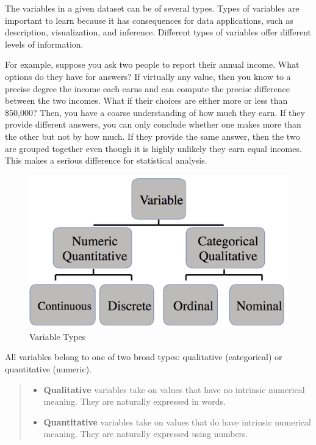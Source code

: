 \documentclass[
]{book}
\providecommand{\tightlist}{%
  \setlength{\itemsep}{0pt}\setlength{\parskip}{0pt}}
\begin{document}
The variables in a given dataset can be of several types. Types of variables are important to learn because it has consequences for data applications, such as description, visualization, and inference. Different types of variables offer different levels of information.

For example, suppose you ask two people to report their annual income. What options do they have for answers? If virtually any value, then you know to a precise degree the income each earns and can compute the precise difference between the two incomes. What if their choices are either more or less than \$50,000? Then, you have a coarse understanding of how much they earn. If they provide different answers, you can only conclude whether one makes more than the other but not by how much. If they provide the same answer, then the two are grouped together even though it is highly unlikely they earn equal incomes. This makes a serious difference for statistical analysis.

\begin{figure}

{\centering \includegraphics[width=\textwidth]{images/variables} 

}

\caption{Variable Types}\label{fig:vartypefig}
\end{figure}

All variables belong to one of two broad types: qualitative (categorical) or quantitative (numeric).

\begin{quote}
\begin{itemize}
\tightlist
\item
  \textbf{Qualitative} variables take on values that have no intrinsic numerical meaning. They are naturally expressed in words.
\item
  \textbf{Quantitative} variables take on values that do have intrinsic numerical meaning. They are naturally expressed using numbers.
\end{itemize}
\end{quote}
\end{document}
